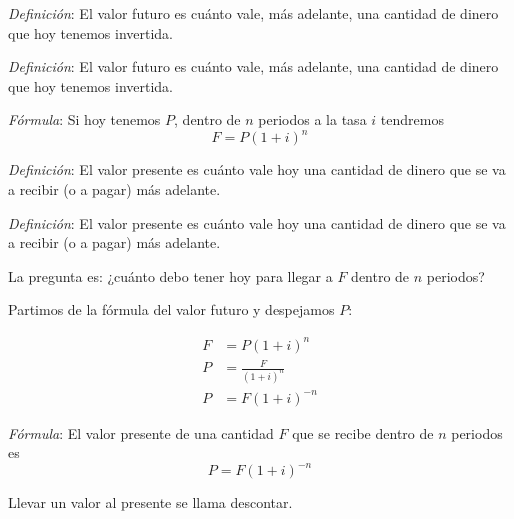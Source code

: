 \documentclass{beamer}
\begin{document}
  \begin{frame}
    \textit{Definición}: El valor futuro es cuánto vale, más adelante, una
    cantidad de dinero que hoy tenemos invertida.
  \end{frame}

  \begin{frame}
    \textit{Definición}: El valor futuro es cuánto vale, más adelante, una
    cantidad de dinero que hoy tenemos invertida.
    \newline\newline

    \textit{Fórmula}: Si hoy tenemos $P$, dentro de $n$ periodos a la tasa $i$
    tendremos
    \[F = P(1+i)^n\]
  \end{frame}

  \begin{frame}
    \textit{Definición}: El valor presente es cuánto vale hoy una cantidad de
    dinero que se va a recibir (o a pagar) más adelante.
  \end{frame}

  \begin{frame}
    \textit{Definición}: El valor presente es cuánto vale hoy una cantidad de
    dinero que se va a recibir (o a pagar) más adelante.
    \newline\newline

    La pregunta es: ¿cuánto debo tener hoy para llegar a $F$ dentro de $n$
    periodos?
  \end{frame}

  \begin{frame}
    Partimos de la fórmula del valor futuro y despejamos $P$:

    \begin{equation*}
      \begin{aligned}
        F &= P(1+i)^n \\
        P &= \frac{F}{(1+i)^n} \\
        P &= F(1+i)^{-n}
      \end{aligned}
    \end{equation*}
  \end{frame}

  \begin{frame}
    \textit{Fórmula}: El valor presente de una cantidad $F$ que se recibe dentro
    de $n$ periodos es
    \[P = F(1+i)^{-n}\]

    Llevar un valor al presente se llama descontar.
  \end{frame}
\end{document}
